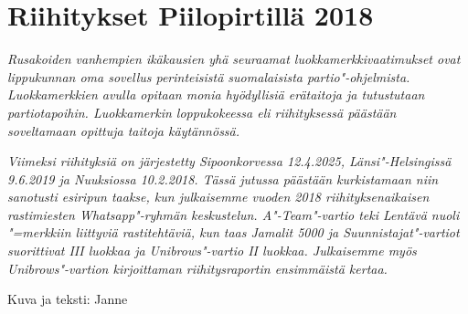 \section{Riihitykset Piilopirtillä 2018}

\textit{Rusakoiden vanhempien ikäkausien yhä seuraamat 
luokkamerkkivaatimukset ovat lippukunnan oma sovellus perinteisistä 
suomalaisista partio"-ohjelmista. Luokkamerkkien avulla opitaan monia 
hyödyllisiä erätaitoja ja tutustutaan partiotapoihin. Luokkamerkin 
loppukokeessa eli riihityksessä päästään soveltamaan opittuja taitoja 
käytännössä.}

\textit{Viimeksi riihityksiä on järjestetty Sipoonkorvessa 12.4.2025, 
Länsi"-Helsingissä 9.6.2019 ja Nuuksiossa 10.2.2018. Tässä jutussa 
päästään kurkistamaan niin sanotusti esiripun taakse, kun julkaisemme 
vuoden 2018 riihityksenaikaisen rastimiesten Whatsapp"-ryhmän keskustelun. 
A"-Team"-vartio teki Lentävä nuoli "=merkkiin liittyviä rastitehtäviä, kun 
taas Jamalit 5000 ja Suunnistajat"-vartiot suorittivat III luokkaa ja 
Unibrows"-vartio II luokkaa. Julkaisemme myös Unibrows"-vartion kirjoittaman 
riihitysraportin ensimmäistä kertaa.}

\medskip

\noindent\null\hfill Kuva ja teksti: Janne

